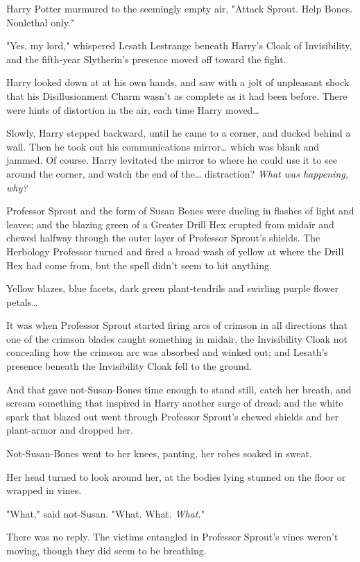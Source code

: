 Harry Potter murmured to the seemingly empty air, "Attack Sprout. Help Bones. 
Nonlethal only."

"Yes, my lord," whispered Lesath Lestrange beneath Harry's Cloak of 
Invisibility, and the fifth-year Slytherin's presence moved off toward the 
fight.

Harry looked down at at his own hands, and saw with a jolt of unpleasant shock 
that his Disillusionment Charm wasn't as complete as it had been before. There 
were hints of distortion in the air, each time Harry moved{\ldots}

Slowly, Harry stepped backward, until he came to a corner, and ducked behind a 
wall. Then he took out his communications mirror{\ldots} which was blank and 
jammed. Of course. Harry levitated the mirror to where he could use it to see 
around the corner, and watch the end of the{\ldots} distraction? \emph{What was 
happening, why?}

Professor Sprout and the form of Susan Bones were dueling in flashes of light 
and leaves; and the blazing green of a Greater Drill Hex erupted from midair 
and chewed halfway through the outer layer of Professor Sprout's shields. The 
Herbology Professor turned and fired a broad wash of yellow at where the Drill 
Hex had come from, but the spell didn't seem to hit anything.

Yellow blazes, blue facets, dark green plant-tendrils and swirling purple 
flower petals{\ldots}

It was when Professor Sprout started firing arcs of crimson in all directions 
that one of the crimson blades caught something in midair, the Invisibility 
Cloak not concealing how the crimson arc was absorbed and winked out; and 
Lesath's presence beneath the Invisibility Cloak fell to the ground.

And that gave not-Susan-Bones time enough to stand still, catch her breath, and 
scream something that inspired in Harry another surge of dread; and the white 
spark that blazed out went through Professor Sprout's chewed shields and her 
plant-armor and dropped her.

Not-Susan-Bones went to her knees, panting, her robes soaked in sweat.

Her head turned to look around her, at the bodies lying stunned on the floor or 
wrapped in vines.

"What," said not-Susan. "What. What. \emph{What.}"

There was no reply. The victims entangled in Professor Sprout's vines weren't 
moving, though they did seem to be breathing.


